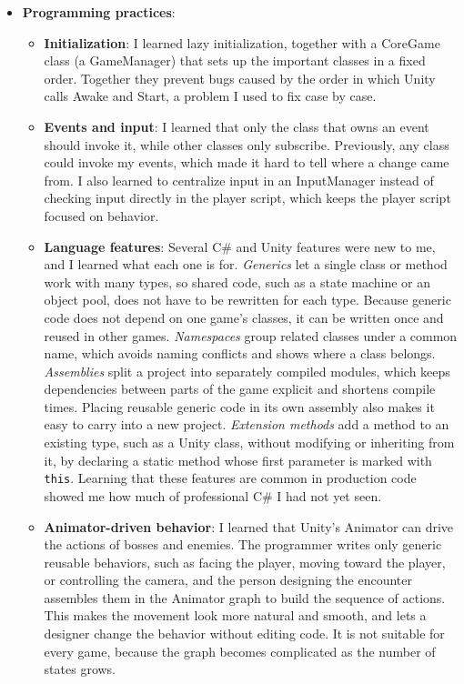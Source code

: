 \begin{itemize}[label=-]
    \item \textbf{Programming practices}:
    \begin{itemize}[label=$\circ$]
        \item \textbf{Initialization}: I learned lazy initialization, together with a CoreGame class (a GameManager) that sets up the important classes in a fixed order. Together they prevent bugs caused by the order in which Unity calls Awake and Start, a problem I used to fix case by case.
        \item \textbf{Events and input}: I learned that only the class that owns an event should invoke it, while other classes only subscribe. Previously, any class could invoke my events, which made it hard to tell where a change came from. I also learned to centralize input in an InputManager instead of checking input directly in the player script, which keeps the player script focused on behavior.
        \item \textbf{Language features}: Several C\# and Unity features were new to me, and I learned what each one is for. \textit{Generics} let a single class or method work with many types, so shared code, such as a state machine or an object pool, does not have to be rewritten for each type. Because generic code does not depend on one game's classes, it can be written once and reused in other games. \textit{Namespaces} group related classes under a common name, which avoids naming conflicts and shows where a class belongs. \textit{Assemblies} split a project into separately compiled modules, which keeps dependencies between parts of the game explicit and shortens compile times. Placing reusable generic code in its own assembly also makes it easy to carry into a new project. \textit{Extension methods} add a method to an existing type, such as a Unity class, without modifying or inheriting from it, by declaring a static method whose first parameter is marked with \texttt{this}. Learning that these features are common in production code showed me how much of professional C\# I had not yet seen.
        \pagebreak
        \item \textbf{Animator-driven behavior}: I learned that Unity's Animator can drive the actions of bosses and enemies. The programmer writes only generic reusable behaviors, such as facing the player, moving toward the player, or controlling the camera, and the person designing the encounter assembles them in the Animator graph to build the sequence of actions. This makes the movement look more natural and smooth, and lets a designer change the behavior without editing code. It is not suitable for every game, because the graph becomes complicated as the number of states grows.
    \end{itemize}


\end{itemize}
